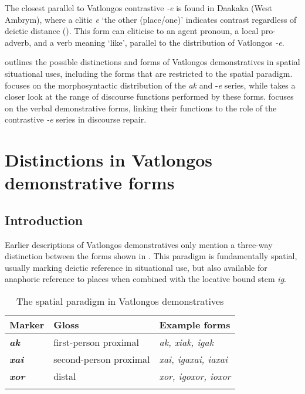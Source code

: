 \documentclass[output=paper,colorlinks,citecolor=brown]{langscibook}
\begin{document}
The closest parallel to Vatlongos contrastive \textit{-e} is found in Daakaka (West Ambrym), where a clitic \textit{e} ‘the other (place/one)’ indicates contrast regardless of deictic distance (\citealt[175-176, 333]{Prince2015}). This form can cliticise to an agent pronoun, a local pro-adverb, and a verb meaning ‘like’, parallel to the distribution of Vatlongos \textit{-e}.

 outlines the possible distinctions and forms of Vatlongos demonstratives in spatial situational uses, including the forms that are restricted to the spatial paradigm.  focuses on the morphosyntactic distribution of the \textit{ak} and -\textit{e} series, while  takes a closer look at the range of discourse functions performed by these forms.  focuses on the verbal demonstrative forms, linking their functions to the role of the contrastive \textit{-e} series in discourse repair.


\section{Distinctions in Vatlongos demonstrative forms}
\label{sec:ridge:2}

\subsection{Introduction}
\label{sec:ridge:2.1}

Earlier descriptions of Vatlongos demonstratives only mention a three-way distinction between the forms shown in . This paradigm is fundamentally spatial, usually marking deictic reference in situational use, but also available for anaphoric reference to places when combined with the locative bound stem \textit{ig}.

\begin{table}
\caption{The spatial paradigm in Vatlongos demonstratives}
\label{tab:ridge:2}
\begin{tabularx}{\textwidth}{lQl}
\lsptoprule
\textbf{Marker} & \textbf{Gloss} & \textbf{Example forms}\\
\midrule
{\textbf{\textit{ak}}} & {first-person proximal} & {\textit{ak, xiak, igak}}\\
{\textbf{\textit{xai}} } & {second-person proximal} & {\textit{xai, igaxai, iaxai}} \\
{\textbf{\textit{xor}}} & {distal} & {\textit{xor, igoxor, ioxor}}\\
\lspbottomrule
\end{tabularx}
\end{table}
\end{document}
